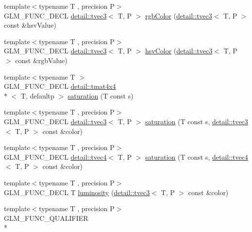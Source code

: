 \begin{DoxyCompactItemize}
\item 
{\footnotesize template$<$typename T , precision P$>$ }\\G\-L\-M\-\_\-\-F\-U\-N\-C\-\_\-\-D\-E\-C\-L \hyperlink{structglm_1_1detail_1_1tvec3}{detail\-::tvec3}$<$ T, P $>$ \hyperlink{group__gtx__color__space_gafe29cc37c2675aee66c9f9ae3e5e7294}{rgb\-Color} (\hyperlink{structglm_1_1detail_1_1tvec3}{detail\-::tvec3}$<$ T, P $>$ const \&hsv\-Value)
\item 
{\footnotesize template$<$typename T , precision P$>$ }\\G\-L\-M\-\_\-\-F\-U\-N\-C\-\_\-\-D\-E\-C\-L \hyperlink{structglm_1_1detail_1_1tvec3}{detail\-::tvec3}$<$ T, P $>$ \hyperlink{group__gtx__color__space_ga9d3d99c06af10403d317dec0cb655090}{hsv\-Color} (\hyperlink{structglm_1_1detail_1_1tvec3}{detail\-::tvec3}$<$ T, P $>$ const \&rgb\-Value)
\item 
{\footnotesize template$<$typename T $>$ }\\G\-L\-M\-\_\-\-F\-U\-N\-C\-\_\-\-D\-E\-C\-L \hyperlink{structglm_1_1detail_1_1tmat4x4}{detail\-::tmat4x4}\\*
$<$ T, defaultp $>$ \hyperlink{group__gtx__color__space_ga444bcc8582eaa894acf405762ba2a5ff}{saturation} (T const s)
\item 
{\footnotesize template$<$typename T , precision P$>$ }\\G\-L\-M\-\_\-\-F\-U\-N\-C\-\_\-\-D\-E\-C\-L \hyperlink{structglm_1_1detail_1_1tvec3}{detail\-::tvec3}$<$ T, P $>$ \hyperlink{group__gtx__color__space_ga1a6fe89b5effcc718b5f49de5bb50fad}{saturation} (T const s, \hyperlink{structglm_1_1detail_1_1tvec3}{detail\-::tvec3}$<$ T, P $>$ const \&color)
\item 
{\footnotesize template$<$typename T , precision P$>$ }\\G\-L\-M\-\_\-\-F\-U\-N\-C\-\_\-\-D\-E\-C\-L \hyperlink{structglm_1_1detail_1_1tvec4}{detail\-::tvec4}$<$ T, P $>$ \hyperlink{group__gtx__color__space_ga42cc34c45ab66e010c629106952c8bdd}{saturation} (T const s, \hyperlink{structglm_1_1detail_1_1tvec4}{detail\-::tvec4}$<$ T, P $>$ const \&color)
\item 
{\footnotesize template$<$typename T , precision P$>$ }\\G\-L\-M\-\_\-\-F\-U\-N\-C\-\_\-\-D\-E\-C\-L T \hyperlink{group__gtx__color__space_ga3fb6710bbbf4f3e2303b06946e9cf00c}{luminosity} (\hyperlink{structglm_1_1detail_1_1tvec3}{detail\-::tvec3}$<$ T, P $>$ const \&color)
\item 
{\footnotesize template$<$typename T , precision P$>$ }\\G\-L\-M\-\_\-\-F\-U\-N\-C\-\_\-\-Q\-U\-A\-L\-I\-F\-I\-E\-R \\*

\end{DoxyCompactItemize}
